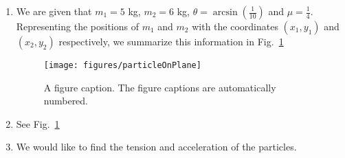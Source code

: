 %
%
%

\begin{enumerate}[label = \bfseries (\alph*)]

\item 

We are given that $m_1 = 5$ kg, $m_2 = 6$ kg, $\theta = \arcsin\left(\frac{1}{10}\right)$ and $\mu = \frac{1}{4}$. Representing the positions of $m_1$ and $m_2$ with the coordinates $(x_1,y_1)$ and $(x_2,y_2)$ respectively, we summarize this information in Fig.~\ref{2015:q5:fig:force1}

\begin{figure}
\begin{center}
\texttt{[image: figures/particleOnPlane]}
\caption{\label{2015:q5:fig:force1} A figure caption. The figure captions are
automatically numbered.}
\end{center}
\end{figure}


\item See Fig.~\ref{2015:q5:fig:force1}

\item We would like to find the tension and acceleration of the particles.



\end{enumerate}
